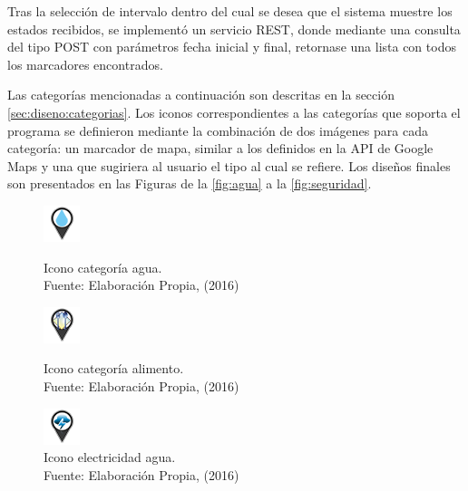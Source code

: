 Tras la selección de intervalo dentro del cual se desea que el sistema muestre los estados recibidos, se implementó un servicio REST, donde mediante una consulta del tipo POST con parámetros fecha inicial y final, retornase una lista con todos los marcadores encontrados.

Las categorías mencionadas a continuación son descritas en la sección \ref{sec:diseno:categorias}. Los iconos correspondientes a las categorías que soporta el programa se definieron mediante la combinación de dos imágenes para cada categoría: un marcador de mapa, similar a los definidos en la API de Google Maps y una que sugiriera al usuario el tipo al cual se refiere. Los diseños finales son presentados en las Figuras de la \ref{fig:agua} a la \ref{fig:seguridad}.

\begin{figure}[!htb]
	\centering
	\captionsetup{justification=centering}
	\includegraphics[scale=1]{images/categorias/agua.png}
	\caption[Icono categoría agua.]{Icono categoría agua.\\Fuente: Elaboración Propia, (2016)}
	\label{fig:agua}
	\endminipage\hfill
	\centering
	\captionsetup{justification=centering}
	\includegraphics[scale=1]{images/categorias/alimento.png}
	\caption[Icono categoría alimento.]{Icono categoría alimento.\\Fuente: Elaboración Propia, (2016)}
	\label{fig:alimento}
	\endminipage\hfill
	\centering
	\captionsetup{justification=centering}
	\includegraphics[scale=1]{images/categorias/electricidad.png}
	\caption[Icono categoría electricidad.]{Icono electricidad agua.\\Fuente: Elaboración Propia, (2016)}
	\label{fig:electricidad}
	\endminipage\hfill
\end{figure}

